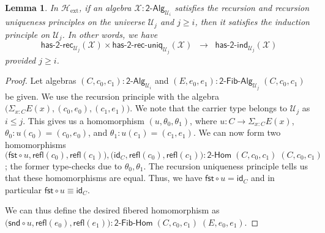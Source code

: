 \documentclass[11pt]{article}
\newcommand{\X}{\mathcal{X}}
\newcommand{\fst}{\mathsf{fst}}
\newcommand{\snd}{\mathsf{snd}}
\newcommand{\comp}{\circ}
\newcommand{\idfun}[1]{\mathsf{id}_{#1}}
\newcommand{\sm}[1]{\Sigma_{#1}}
\newcommand{\refl}{\mathsf{refl}}
\newcommand{\UU}{\mathcal{U}}
\newcommand{\BoolAlg}{\mathsf{2}\text{-}\mathsf{Alg}}
\newcommand{\BoolHom}{\mathsf{2}\text{-}\mathsf{Hom}}
\newcommand{\HasBoolRec}{\mathsf{has}\text{-}\mathsf{2}\text{-}\mathsf{rec}}
\newcommand{\HasBoolInd}{\mathsf{has}\text{-}\mathsf{2}\text{-}\mathsf{ind}}
\newcommand{\HasBoolRecUniq}{\mathsf{has}\text{-}\mathsf{2}\text{-}\mathsf{rec}\text{-}\mathsf{uniq}}
\newcommand{\BoolFibAlg}{\mathsf{2}\text{-}\mathsf{Fib}\text{-}\mathsf{Alg}}
\newcommand{\BoolFibHom}{\mathsf{2}\text{-}\mathsf{Fib}\text{-}\mathsf{Hom}}
\newcommand{\Hext}{\mathcal{H}_{\mathrm{ext}}}
\newtheorem{lemma}[theorem]{Lemma}
\theoremstyle{definition}
\begin{document}
\begin{lemma}\label{lem:BoolRecUniqImpInd}
In $\Hext$, if an algebra $\X : \BoolAlg_{\UU_i}$ satisfies the recursion and recursion uniqueness principles on the universe $\UU_j$ and $j \geq i$, then it satisfies the induction principle on $\UU_j$. In other words, we have
\[ \HasBoolRec_{\UU_j}(\X) \times \HasBoolRecUniq_{\UU_j}(\X) \;\; \rightarrow \; \; \HasBoolInd_{\UU_j}(\X) \]
provided $j \geq i$.
\end{lemma}
\begin{proof}
Let algebras $(C,c_0,c_1) : \BoolAlg_{\UU_i}$ and $(E,e_0,e_1) : \BoolFibAlg_{\UU_j} \; (C,c_0,c_1)$ be given. 
We use the recursion principle with the algebra $\big(\sm{x:C} E(x), (c_0,e_0), (c_1,e_1)\big)$. We note that the carrier type belongs to $\UU_j$ as $i \leq j$. This gives us a homomorphism $(u,\theta_0,\theta_1)$, where $u : C \to \sm{x:C} E(x)$, $\theta_0 : u(c_0) = (c_0,e_0)$, and $\theta_1 : u(c_1) = (c_1,e_1)$. We can now form two homomorphisms $\big(\fst \comp u, \refl(c_0), \refl(c_1)\big), \big(\idfun{C}, \refl(c_0), \refl(c_1)\big) : \BoolHom \; (C,c_0,c_1) \; (C,c_0,c_1)$; the former type-checks due to $\theta_0, \theta_1$. The recursion uniqueness principle tells us that these homomorphisms are equal. Thus, we have $\fst \comp u = \idfun{C}$ and in particular $\fst \comp u \equiv \idfun{C}$. 

We can thus define the desired fibered homomorphism as $\big(\snd \comp u, \refl(e_0), \refl(e_1)\big) : \BoolFibHom \; (C,c_0,c_1) \; (E,e_0,e_1)$.
\end{proof}
\end{document}
